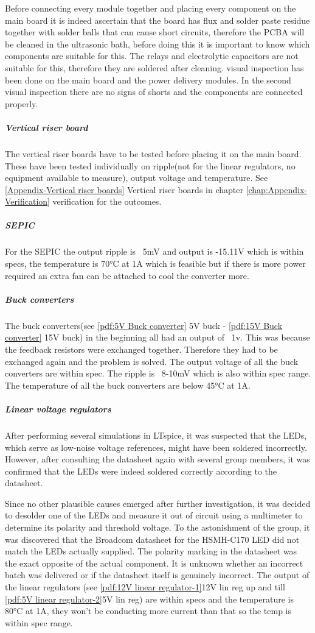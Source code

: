Before connecting every module together and placing every component on the main board it is indeed ascertain that the board has flux and solder paste residue together with solder balls that can cause short circuits, therefore the PCBA will be cleaned in the ultrasonic bath, before doing this it is important to know which components are suitable for this. The relays and electrolytic capacitors are not suitable for this, therefore they are soldered after cleaning.  visual inspection has been done on the main board and the power delivery modules. In the second visual inspection there are no signs of shorts and the components are connected properly.

\subparagraph{Vertical riser board}
The vertical riser boards have to be tested before placing it on the main board. These have been tested individually on ripple(not for the linear regulators, no equipment available to measure), output voltage and temperature. See \ref{Appendix-Vertical riser boards} Vertical riser boards in chapter \ref{chap:Appendix-Verification} verification for the outcomes.  \subparagraph{SEPIC} For the SEPIC the output ripple is ~5mV and output is -15.11V which is within specs, the temperature is 70°C at 1A which is feasible but if there is more power required an extra fan can be attached to cool the converter more. 
\subparagraph{Buck converters} The buck converters(see \ref{pdf:5V Buck converter} 5V buck - \ref{pdf:15V Buck converter} 15V buck) in the beginning all had an output of ~1v. This was because the feedback resistors were exchanged together. Therefore they had to be exchanged again and the problem is solved. The output voltage of all the buck converters are within spec. The ripple is ~8-10mV which is also within spec range. The temperature of all the buck converters are below 45°C at 1A. 
\subparagraph{Linear voltage regulators} After performing several simulations in LTspice, it was suspected that the LEDs, which serve as low-noise voltage references, might have been soldered incorrectly. However, after consulting the datasheet again with several group members, it was confirmed that the LEDs were indeed soldered correctly according to the datasheet.

Since no other plausible causes emerged after further investigation, it was decided to desolder one of the LEDs and measure it out of circuit using a multimeter to determine its polarity and threshold voltage. To the astonishment of the group, it was discovered that the Broadcom datasheet for the HSMH-C170 LED did not match the LEDs actually supplied. The polarity marking in the datasheet was the exact opposite of the actual component. It is unknown whether an incorrect batch was delivered or if the datasheet itself is genuinely incorrect.
The output of the linear regulators (see \ref{pdf:12V linear regulator-1}12V lin reg up and till \ref{pdf:5V linear regulator-2}5V lin reg) are within specs and the temperature is 80°C at 1A, they won't be conducting more current than that so the temp is within spec range.

